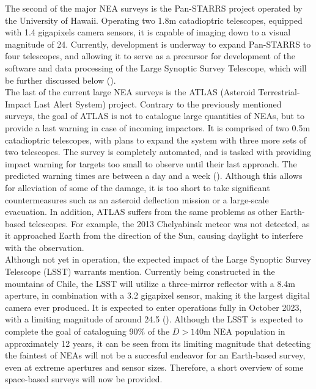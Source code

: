 The second of the major NEA surveys is the Pan-STARRS project operated by the University of Hawaii. Operating two 1.8m catadioptric telescopes, equipped with 1.4 gigapixels camera sensors, it is capable of imaging down to a visual magnitude of 24. Currently, development is underway to expand Pan-STARRS to four telescopes, and allowing it to serve as a precursor for development of the software and data processing of the Large Synoptic Survey Telescope, which will be further discussed below (\cite{PANSTARRS}).\\

The last of the current large NEA surveys is the ATLAS (Asteroid Terrestrial-Impact Last Alert System) project. Contrary to the previously mentioned surveys, the goal of ATLAS is not to catalogue large quantities of NEAs, but to provide a last warning in case of incoming impactors. It is comprised of two 0.5m catadioptric telescopes, with plans to expand the system with three more sets of two telescopes. The survey is completely automated, and is tasked with providing impact warning for targets too small to observe until their last approach. The predicted warning times are between a day and a week (\cite{ATLAS}). Although this allows for alleviation of some of the damage, it is too short to take significant countermeasures such as an asteroid deflection mission or a large-scale evacuation. In addition, ATLAS suffers from the same problems as other Earth-based telescopes. For example, the 2013 Chelyabinsk meteor was not detected, as it approached Earth from the direction of the Sun, causing daylight to interfere with the observation.\\

Although not yet in operation, the expected impact of the Large Synoptic Survey Telescope (LSST) warrants mention. Currently being constructed in the mountains of Chile, the LSST will utilize a three-mirror reflector with a 8.4m aperture, in combination with a 3.2 gigapixel sensor, making it the largest digital camera ever produced. It is expected to enter operations fully in October 2023, with a limiting magnitude of around 24.5 (\cite{LSST}). Although the LSST is expected to complete the goal of cataloguing 90\% of the $D > 140 \mathrm{m}$ NEA population in approximately 12 years, it can be seen from its limiting magnitude that detecting the faintest of NEAs will not be a succesful endeavor for an Earth-based survey, even at extreme apertures and sensor sizes. Therefore, a short overview of some space-based surveys will now be provided.\\

